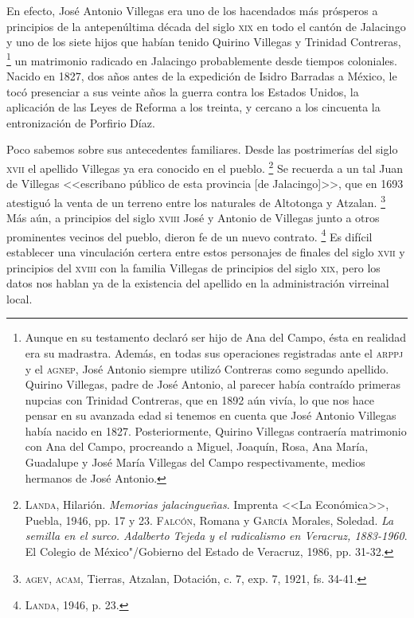 \documentclass[14pt,twoside,final]{extbook} %
\let\oldfootnote\footnote
\renewcommand\footnote[1]{%
\oldfootnote{\hspace{1mm}#1}}
\begin{document}
En efecto, José Antonio Villegas era uno de los hacendados más prósperos a principios de la antepenúltima década del siglo \textsc{xix} en todo el cantón de Jalacingo y uno de los siete hijos que habían tenido Quirino Villegas y Trinidad Contreras,\footnote{Aunque en su testamento declaró ser hijo de Ana del Campo, ésta en realidad era su madrastra. Además, en todas sus operaciones registradas ante el \textsc{arppj} y el \textsc{agnep}, José Antonio siempre utilizó Contreras como segundo apellido. Quirino Villegas, padre de José Antonio, al parecer había contraído primeras nupcias con Trinidad Contreras, que en 1892 aún vivía, lo que nos hace pensar en su avanzada edad si tenemos en cuenta que José Antonio Villegas había nacido en 1827. Posteriormente, Quirino Villegas contraería matrimonio con Ana del Campo, procreando a Miguel, Joaquín, Rosa, Ana María, Guadalupe y José María Villegas del Campo respectivamente, medios hermanos de José Antonio.} un matrimonio radicado en Jalacingo probablemente desde tiempos coloniales. Nacido en 1827, dos años antes de la expedición de Isidro Barradas a México, le tocó presenciar a sus veinte años la guerra contra los Estados Unidos, la aplicación de las Leyes de Reforma a los treinta, y cercano a los cincuenta la entronización de Porfirio Díaz.

Poco sabemos sobre sus antecedentes familiares. Desde las postrimerías del siglo \textsc{xvii} el apellido Villegas ya era conocido en el pueblo.\footnote{\textsc{Landa}, Hilarión. \emph{Memorias jalacingueñas}. Imprenta <<La Económica>>, Puebla, 1946, pp. 17 y 23. \textsc{Falcón}, Romana y \textsc{García} Morales, Soledad. \emph{La semilla en el surco. Adalberto Tejeda y el radicalismo en Veracruz, 1883-1960}. El Colegio de México"/Gobierno del Estado de Veracruz, 1986, pp. 31-32.} Se recuerda a un tal Juan de Villegas <<escribano público de esta provincia [de Jalacingo]>>, que en 1693 atestiguó la venta de un terreno entre los naturales de Altotonga y Atzalan.\footnote{\textsc{agev, acam}, Tierras, Atzalan, Dotación, c. 7, exp. 7, 1921, fs. 34-41.} Más aún, a principios del siglo \textsc{xviii} José y Antonio de Villegas junto a otros prominentes vecinos del pueblo, dieron fe de un nuevo contrato.\footnote{\textsc{Landa}, 1946, p. 23.} Es difícil establecer una vinculación certera entre estos personajes de finales del siglo \textsc{xvii} y principios del \textsc{xviii} con la familia Villegas de principios del siglo \textsc{xix}, pero los datos nos hablan ya de la existencia del apellido en la administración virreinal local.
\end{document}
